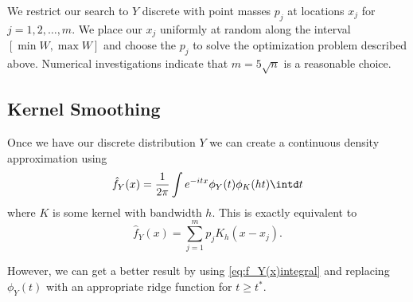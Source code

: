 We restrict our search to $Y$ discrete with point masses $p_j$ at locations $x_j$ for $j = 1,2,\dots,m$. We place our $x_j$ uniformly at random along the interval $[\min W, \max W]$ and choose the $p_j$ to solve the optimization problem described above. Numerical investigations indicate that $m = 5 \sqrt{n}$ is a reasonable choice.

\subsection{Kernel Smoothing}
\label{ssec:KernelSmoothing}
Once we have our discrete distribution $Y$ we can create a continuous density approximation using
\begin{equation}
\hat{f}_Y(x) = \frac{1}{2\pi} \int e^{-itx} \phi_Y(t) \phi_K(ht)  \intd t
\label{eq:f_Y(x)integral}
\end{equation}
where $K$ is some kernel with bandwidth $h$. This is exactly equivalent to
\begin{equation}
\hat{f}_Y(x) = \sum_{j=1}^m p_j K_h(x - x_j).
\label{eq:f_Y(x)sum}
\end{equation}

However, we can get a better result by using \eqref{eq:f_Y(x)integral} and replacing $\phi_Y(t)$ with an appropriate ridge function for $t \geq t^*$.

